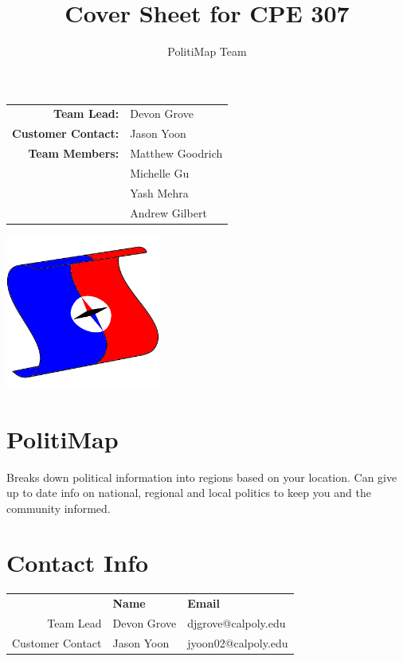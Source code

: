 \documentclass{article}
\title{Cover Sheet for CPE 307}
\author{PolitiMap Team}
\begin{document}
\maketitle
\thispagestyle{empty}
\begin{center}
  \begin{tabular}{rl}
    \textbf{Team Lead:}        & Devon Grove      \\
    \textbf{Customer Contact:} & Jason Yoon       \\
     \textbf{Team Members:}    & Matthew Goodrich \\
                               & Michelle Gu      \\
                               & Yash Mehra       \\
                               & Andrew Gilbert
  \end{tabular}

  \vspace{.5in}

  \includegraphics[trim=0 10 0 10,width=2in]{logo.png}

  \vspace{.2in}

  \section*{PolitiMap}
  Breaks down political information into regions
  based on your location. Can give up to date info on national,
  regional and local politics to keep you and the community
  informed.

  \vspace{.6in}

  \section*{Contact Info}
  \renewcommand{\arraystretch}{1.25}
  \begin{tabular}{rll}
    \toprule
    & \textbf{Name} & \textbf{Email} \\
    \cmidrule{2-3}
    Team Lead & Devon Grove & djgrove@calpoly.edu\\
    Customer Contact & Jason Yoon & jyoon02@calpoly.edu\\
    \bottomrule
  \end{tabular}
\end{center}
\end{document}
